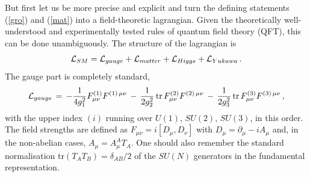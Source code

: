 \documentclass[12pt]{article}
\newcommand{\be}{\begin{equation}}
\newcommand{\ee}{\end{equation}}
\numberwithin{equation}{section}
\begin{document}
But first let us be more precise and explicit and turn the defining statements (\ref{gro}) and (\ref{mat}) into a field-theoretic lagrangian. Given the theoretically well-understood and experimentally tested rules of quantum field theory (QFT), this can be done unambiguously. The structure of the lagrangian is 
\be
{\cal L}_{SM}={\cal L}_{gauge}+{\cal L}_{matter}+{\cal L}_{Higgs}+{\cal L}_{Yukawa}\,.
\ee
The gauge part is completely standard,
\be
{\cal L}_{gauge}\,=\,-\frac{1}{4g_1^2}F_{\mu\nu}^{(1)}F^{(1)\,\mu\nu}
\,-\,\frac{1}{2g_2^2}\,\mbox{tr}\,F_{\mu\nu}^{(2)}F^{(2)\,\mu\nu}
\,-\,\frac{1}{2g_3^2}\,\mbox{tr}\,F_{\mu\nu}^{(3)}F^{(3)\,\mu\nu}\,,
\ee
with the upper index $(i)$ running over $U(1)$, $SU(2)$, $SU(3)$, in this order. The field strengths are defined as $F_{\mu\nu}=i[D_\mu,D_\nu]$ with $D_\mu=\partial_\mu-iA_\mu$ and, in the non-abelian cases, $A_\mu=A_\mu^A T_A$. One should also remember the standard normalisation tr$(T_AT_B)=\delta_{AB}/2$ of the $SU(N)$ generators in the fundamental representation. 
\end{document}
